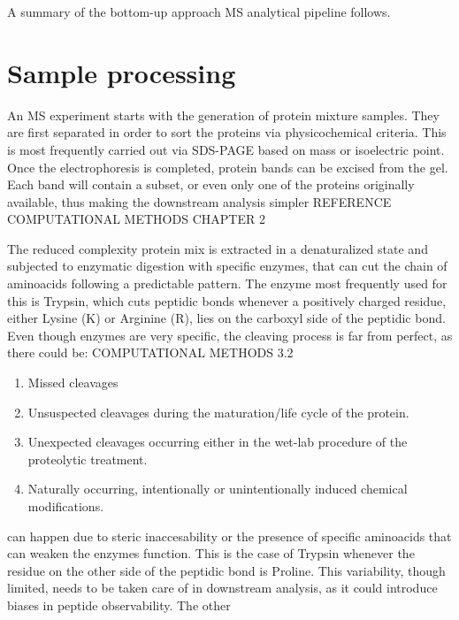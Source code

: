 \documentclass[11pt, a4paper]{report}
\begin{document}
A summary of the bottom-up approach MS analytical pipeline follows.


\section{Sample processing}
\label{sec:sample_processing}

An \ac{MS} experiment starts with the generation of protein mixture samples. They are first separated in order to sort the proteins via physicochemical criteria. This is most frequently carried out via SDS-PAGE based on mass or isoelectric point. Once the electrophoresis is completed, protein bands can be excised from the gel. Each band will contain a subset, or even only one of the proteins originally available, thus making the downstream analysis simpler REFERENCE COMPUTATIONAL METHODS CHAPTER 2

The reduced complexity protein mix is extracted in a denaturalized state and subjected to enzymatic digestion with specific enzymes, that can cut the chain of aminoacids following a predictable pattern. The enzyme most frequently used for this is Trypsin, which cuts peptidic bonds whenever a positively charged residue, either Lysine (K) or Arginine (R), lies on the carboxyl side of the peptidic bond. Even though enzymes are very specific, the cleaving process is far from perfect, as there could be: COMPUTATIONAL METHODS 3.2

\begin{enumerate}

\item Missed cleavages \label{item:missed_cleavages}

\item Unsuspected cleavages during the maturation/life cycle of the protein.

\item Unexpected cleavages occurring either in the wet-lab procedure of the proteolytic treatment.

\item Naturally occurring, intentionally or unintentionally induced chemical modifications.

\end{enumerate}

 can happen due to steric inaccesability or the presence of specific aminoacids that can weaken the enzyme\textquotesingle s function. This is the case of Trypsin whenever the residue on the other side of the peptidic bond is Proline. This variability, though limited, needs to be taken care of in downstream analysis, as it could introduce biases in peptide observability. The other 
\end{document}
